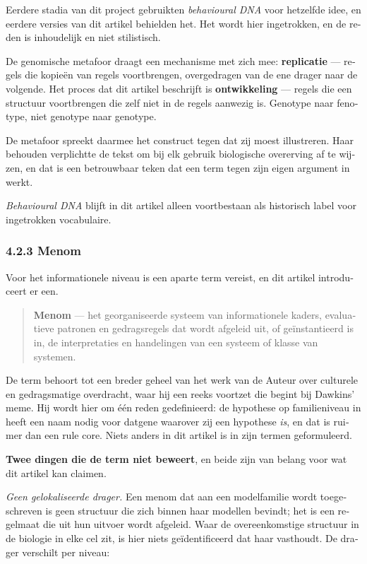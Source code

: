 \begin{dutch}
Eerdere stadia van dit project gebruikten \emph{behavioural DNA} voor hetzelfde idee, en eerdere versies van dit artikel behielden het. Het wordt hier ingetrokken, en de reden is inhoudelijk en niet stilistisch.

De genomische metafoor draagt een mechanisme met zich mee: \textbf{replicatie} — regels die kopieën van regels voortbrengen, overgedragen van de ene drager naar de volgende. Het proces dat dit artikel beschrijft is \textbf{ontwikkeling} — regels die een structuur voortbrengen die zelf niet in de regels aanwezig is. Genotype naar fenotype, niet genotype naar genotype.

De metafoor spreekt daarmee het construct tegen dat zij moest illustreren. Haar behouden verplichtte de tekst om bij elk gebruik biologische overerving af te wijzen, en dat is een betrouwbaar teken dat een term tegen zijn eigen argument in werkt.

\emph{Behavioural DNA} blijft in dit artikel alleen voortbestaan als historisch label voor ingetrokken vocabulaire.


\subsubsection*{4.2.3 Menom}
\label{sec:nl:4.2.3}

Voor het informationele niveau is een aparte term vereist, en dit artikel introduceert er een.

\begin{quote}
\textbf{Menom} — het georganiseerde systeem van informationele kaders, evaluatieve patronen en gedragsregels dat wordt afgeleid uit, of geïnstantieerd is in, de interpretaties en handelingen van een systeem of klasse van systemen.
\end{quote}
De term behoort tot een breder geheel van het werk van de Auteur over culturele en gedragsmatige overdracht, waar hij een reeks voortzet die begint bij Dawkins' meme. Hij wordt hier om één reden gedefinieerd: de hypothese op familieniveau in  heeft een naam nodig voor datgene waarover zij een hypothese \emph{is}, en dat is ruimer dan een rule core. Niets anders in dit artikel is in zijn termen geformuleerd.

\textbf{Twee dingen die de term niet beweert}, en beide zijn van belang voor wat dit artikel kan claimen.

\emph{Geen gelokaliseerde drager.} Een menom dat aan een modelfamilie wordt toegeschreven is geen structuur die zich binnen haar modellen bevindt; het is een regelmaat die uit hun uitvoer wordt afgeleid. Waar de overeenkomstige structuur in de biologie in elke cel zit, is hier niets geïdentificeerd dat haar vasthoudt. De drager verschilt per niveau:


\end{dutch}
